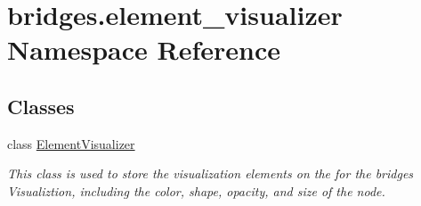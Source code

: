 \hypertarget{namespacebridges_1_1element__visualizer}{}\section{bridges.\+element\+\_\+visualizer Namespace Reference}
\label{namespacebridges_1_1element__visualizer}
\subsection*{Classes}
\begin{DoxyCompactItemize}
\item 
class \mbox{\hyperlink{classbridges_1_1element__visualizer_1_1_element_visualizer}{Element\+Visualizer}}
\begin{DoxyCompactList}\small\item\em This class is used to store the visualization elements on the for the bridges Visualiztion, including the color, shape, opacity, and size of the node. \end{DoxyCompactList}\end{DoxyCompactItemize}
